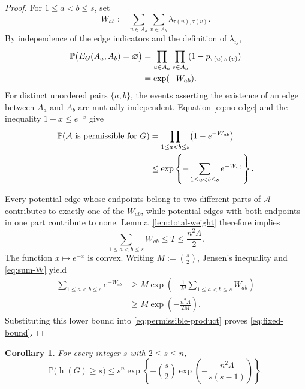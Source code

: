 \documentclass{article}
\newtheorem{cor}[thm]{Corollary}
\newcommand{\Prob}{\mathbb{P}}
\DeclareMathOperator{\had}{h}
\begin{document}
\begin{proof}
For \(1\leq a<b\leq s\), set
\[
 W_{ab}:=
 \sum_{u\in A_a}\sum_{v\in A_b}
 \lambda_{\tau(u),\tau(v)}.
\]
By independence of the edge indicators and the definition of
\(\lambda_{ij}\),
\begin{align}
 \Prob\bigl(E_G(A_a,A_b)=\varnothing\bigr)
 &=\prod_{u\in A_a}\prod_{v\in A_b}
   (1-p_{\tau(u),\tau(v)})\notag\\
 &=\exp(-W_{ab}).
 \label{eq:no-edge}
\end{align}
For distinct unordered pairs \(\{a,b\}\), the events asserting the
existence of an edge between \(A_a\) and \(A_b\) are mutually independent. Equation \eqref{eq:no-edge} and the inequality \(1-x\leq e^{-x}\) give
\begin{align}
 \Prob(\mathcal A\text{ is permissible for }G)
 &=\prod_{1\leq a<b\leq s}
   \bigl(1-e^{-W_{ab}}\bigr)\notag\\
 &\leq
 \exp\left\{-\sum_{1\leq a<b\leq s}e^{-W_{ab}}\right\}.
 \label{eq:permissible-product}
\end{align}

Every potential edge whose endpoints belong to two different parts of
\(\mathcal A\) contributes to exactly one of the \(W_{ab}\), while
potential edges with both endpoints in one part contribute to none.
Lemma~\ref{lem:total-weight} therefore implies
\begin{equation}\label{eq:sum-W}
 \sum_{1\leq a<b\leq s}W_{ab}
 \leq T\leq\frac{n^2\Lambda}{2}.
\end{equation}
The function \(x\mapsto e^{-x}\) is convex. Writing \(M:=\binom{s}{2}\), Jensen's inequality and
\eqref{eq:sum-W} yield
\begin{align*}
 \sum_{1\leq a<b\leq s}e^{-W_{ab}}
 &\geq
 M\exp\left(-\frac1M\sum_{1\leq a<b\leq s}W_{ab}\right)\\
 &\geq
 M\exp\left(-\frac{n^2\Lambda}{2M}\right).
\end{align*}
Substituting this lower bound into
\eqref{eq:permissible-product} proves
\eqref{eq:fixed-bound}.
\end{proof}
\begin{cor}\label{cor:finite} For every integer \(s\) with \(2\leq s\leq n\),
\begin{equation}\label{eq:finite}
 \Prob\bigl(\had(G)\geq s\bigr)
 \leq
 s^n
 \exp\left\{
  -\binom{s}{2}
   \exp\left(-\frac{n^2\Lambda}{s(s-1)}\right)
 \right\}.
\end{equation}
\end{cor}
\end{document}

